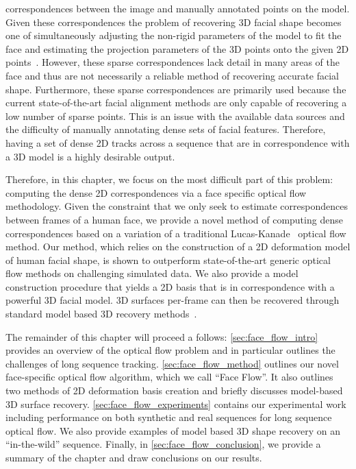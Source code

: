 correspondences between the image and manually annotated points on the model.
Given these correspondences the problem of recovering 3D facial shape becomes
one of simultaneously adjusting the non-rigid parameters of the model to fit
the face and estimating the projection parameters of the 3D points onto the given
2D points~\cite{aldrian2010linear,aldrian2013inverse,bas2016fitting}.
However, these sparse correspondences lack
detail in many areas of the face and thus are not necessarily a reliable method
of recovering accurate facial shape. Furthermore, these sparse correspondences
are primarily used because the current state-of-the-art facial 
alignment methods are only capable of recovering a low number of sparse points.
This is an issue with the available data sources and the difficulty of manually
annotating dense sets of facial features. Therefore, having a set of dense
2D tracks across a sequence that are in correspondence with a 3D model is a
highly desirable output.

Therefore, in this chapter, we focus on the most difficult part of this 
problem: computing the dense 2D correspondences via a face specific
optical flow methodology. Given the constraint
that we only seek to estimate correspondences between frames of a human face,
we provide a novel method of computing dense correspondences based on a variation
of a traditional Lucas-Kanade~\cite{lucas1981iterative} optical flow method.
Our method, which relies on the construction of a 2D deformation model of
human facial shape, is shown to outperform state-of-the-art generic optical flow
methods on challenging simulated data. We also provide a model construction
procedure that yields a 2D basis that is in correspondence with a powerful
3D facial model. 3D surfaces per-frame can then be recovered through standard
model based 3D recovery methods~\cite{aldrian2010linear,aldrian2013inverse,bas2016fitting}.


The remainder of this chapter will proceed a follows: \cref{sec:face_flow_intro}
provides an overview of the optical flow problem and in particular
outlines the challenges of long sequence tracking. \cref{sec:face_flow_method}
outlines our novel face-specific optical flow algorithm, which we call
``Face Flow''. It also outlines two methods of 2D deformation basis
creation and briefly discusses model-based 3D surface recovery.
\cref{sec:face_flow_experiments} contains our experimental work
including performance on both synthetic and real sequences for long
sequence optical flow. We also provide examples of model based 3D shape recovery
on an ``in-the-wild'' sequence. Finally, in \cref{sec:face_flow_conclusion},
we provide a summary of the chapter and draw conclusions on our results.
{






}
\stopcontents[chapters]
